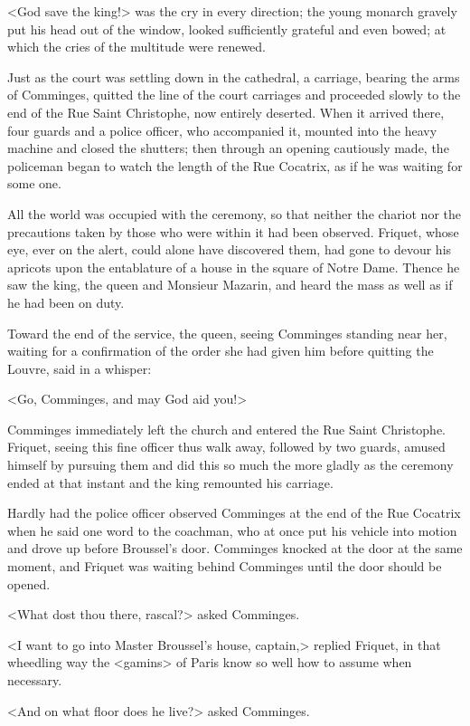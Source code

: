 <God save the king!> was the cry in every direction; the young monarch gravely put his head out of the window, looked sufficiently grateful and even bowed; at which the cries of the multitude were renewed.

Just as the court was settling down in the cathedral, a carriage, bearing the arms of Comminges, quitted the line of the court carriages and proceeded slowly to the end of the Rue Saint Christophe, now entirely deserted. When it arrived there, four guards and a police officer, who accompanied it, mounted into the heavy machine and closed the shutters; then through an opening cautiously made, the policeman began to watch the length of the Rue Cocatrix, as if he was waiting for some one.

All the world was occupied with the ceremony, so that neither the chariot nor the precautions taken by those who were within it had been observed. Friquet, whose eye, ever on the alert, could alone have discovered them, had gone to devour his apricots upon the entablature of a house in the square of Notre Dame. Thence he saw the king, the queen and Monsieur Mazarin, and heard the mass as well as if he had been on duty.

Toward the end of the service, the queen, seeing Comminges standing near her, waiting for a confirmation of the order she had given him before quitting the Louvre, said in a whisper:

<Go, Comminges, and may God aid you!>

Comminges immediately left the church and entered the Rue Saint Christophe. Friquet, seeing this fine officer thus walk away, followed by two guards, amused himself by pursuing them and did this so much the more gladly as the ceremony ended at that instant and the king remounted his carriage.

Hardly had the police officer observed Comminges at the end of the Rue Cocatrix when he said one word to the coachman, who at once put his vehicle into motion and drove up before Broussel's door. Comminges knocked at the door at the same moment, and Friquet was waiting behind Comminges until the door should be opened.

<What dost thou there, rascal?> asked Comminges.

<I want to go into Master Broussel's house, captain,> replied Friquet, in that wheedling way the <gamins> of Paris know so well how to assume when necessary.

<And on what floor does he live?> asked Comminges.

